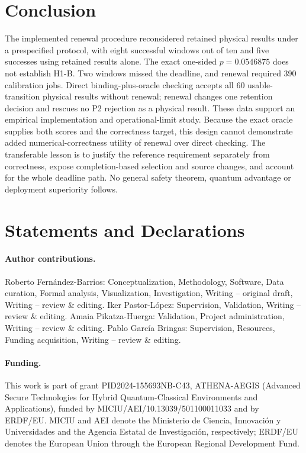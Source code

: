 \documentclass[pdflatex,sn-mathphys-num]{sn-jnl}
\begin{document}
\section{Conclusion}
The implemented renewal procedure reconsidered retained physical results under a prespecified protocol, with eight successful windows out of ten and five successes using retained results alone. The exact one-sided $p=0.0546875$ does not establish H1-B. Two windows missed the deadline, and renewal required 390 calibration jobs. Direct binding-plus-oracle checking accepts all 60 usable-transition physical results without renewal; renewal changes one retention decision and rescues no P2 rejection as a physical result. These data support an empirical implementation and operational-limit study. Because the exact oracle supplies both scores and the correctness target, this design cannot demonstrate added numerical-correctness utility of renewal over direct checking. The transferable lesson is to justify the reference requirement separately from correctness, expose completion-based selection and source changes, and account for the whole deadline path. No general safety theorem, quantum advantage or deployment superiority follows.

\section*{Statements and Declarations}
\paragraph{Author contributions.} Roberto Fernández-Barrios: Conceptualization, Methodology, Software, Data curation, Formal analysis, Visualization, Investigation, Writing -- original draft, Writing -- review \& editing. Iker Pastor-López: Supervision, Validation, Writing -- review \& editing. Amaia Pikatza-Huerga: Validation, Project administration, Writing -- review \& editing. Pablo García Bringas: Supervision, Resources, Funding acquisition, Writing -- review \& editing.
{}
\paragraph{Funding.} This work is part of grant PID2024-155693NB-C43, ATHENA-AEGIS (Advanced Secure Technologies for Hybrid Quantum-Classical Environments and Applications), funded by MICIU/AEI/10.13039/501100011033 and by ERDF/EU. MICIU and AEI denote the Ministerio de Ciencia, Innovación y Universidades and the Agencia Estatal de Investigación, respectively; ERDF/EU denotes the European Union through the European Regional Development Fund.
\end{document}
